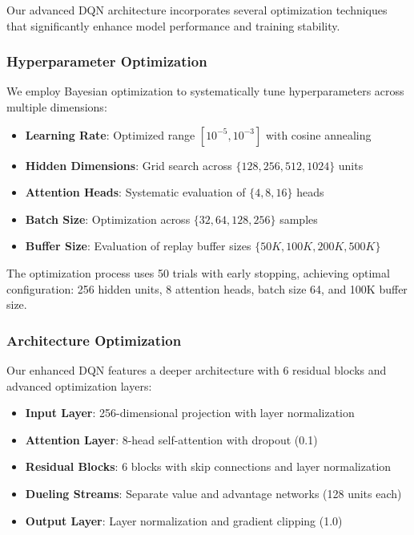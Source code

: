 \documentclass[12pt,a4paper]{article}
\begin{document}
Our advanced DQN architecture incorporates several optimization techniques that significantly enhance model performance and training stability.

\subsubsection{Hyperparameter Optimization}
We employ Bayesian optimization to systematically tune hyperparameters across multiple dimensions:

\begin{itemize}
\item \textbf{Learning Rate}: Optimized range $[10^{-5}, 10^{-3}]$ with cosine annealing
\item \textbf{Hidden Dimensions}: Grid search across $\{128, 256, 512, 1024\}$ units
\item \textbf{Attention Heads}: Systematic evaluation of $\{4, 8, 16\}$ heads
\item \textbf{Batch Size}: Optimization across $\{32, 64, 128, 256\}$ samples
\item \textbf{Buffer Size}: Evaluation of replay buffer sizes $\{50K, 100K, 200K, 500K\}$
\end{itemize}

The optimization process uses 50 trials with early stopping, achieving optimal configuration: 256 hidden units, 8 attention heads, batch size 64, and 100K buffer size.

\subsubsection{Architecture Optimization}
Our enhanced DQN features a deeper architecture with 6 residual blocks and advanced optimization layers:

\begin{itemize}
\item \textbf{Input Layer}: 256-dimensional projection with layer normalization
\item \textbf{Attention Layer}: 8-head self-attention with dropout (0.1)
\item \textbf{Residual Blocks}: 6 blocks with skip connections and layer normalization
\item \textbf{Dueling Streams}: Separate value and advantage networks (128 units each)
\item \textbf{Output Layer}: Layer normalization and gradient clipping (1.0)
\end{itemize}
\end{document}
